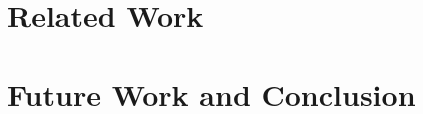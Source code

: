 \documentclass{iosart2c}
\begin{document}



\section{Related Work} \label{sec:relatedwork}

\section{Future Work and Conclusion} \label{sec:futureworkandconclusion}



\end{document}
